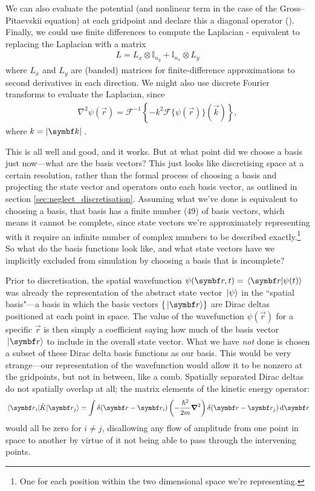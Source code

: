 We can also evaluate the potential (and nonlinear term in the case of the Gross--Pitaevskii equation) at each gridpoint and declare this a diagonal operator (). Finally, we could use finite differences to compute the Laplacian - equivalent to replacing the Laplacian with a matrix
\begin{align}
L = L_x \otimes \mathbb{I}_{n_y} + \mathbb{I}_{n_x} \otimes L_y 
\end{align} 
where $L_x$ and $L_y$ are (banded) matrices for finite-difference approximations to second derivatives in each direction. We might also use discrete Fourier transforms to evaluate the Laplacian, since
\begin{align}
\nabla^2\psi(\vec r) = \mathcal{F}^{-1}\left\{-k^2\mathcal{F}\{\psi(\vec r)\}(\vec k)\right\},
\end{align}
where $ k = \abs{\vec k}$.

This is all well and good, and it works. But at what point did we choose a basis just now---what are the basis vectors? This just looks like discretising space at a certain resolution, rather than the formal process of choosing a basis and projecting the state vector and operators onto each basis vector, as outlined in section \ref{sec:neglect_discretisation}. Assuming what we've done is equivalent to choosing a basis, that basis has a finite number ($49$) of basis vectors, which means it cannot be complete, since state vectors we're approximately representing with it require an infinite number of complex numbers to be described exactly.\footnote{One for each position within the two dimensional space we're representing.} So what do the basis functions look like, and what state vectors have we implicitly excluded from simulation by choosing a basis that is incomplete?

Prior to discretisation, the spatial wavefunction $\psi(\vec r, t) = \braket{\vec r}{\psi(t)}$ was already the representation of the abstract state vector $\ket{\psi}$ in the ``spatial basis"---a basis in which the basis vectors $\{\ket{\vec r}\}$ are Dirac deltas positioned at each point in space. The value of the wavefunction $\psi(\vec r)$ for a specific $\vec r$ is then simply a coefficient saying how much of the basis vector $\ket{\vec r}$ to include in the overall state vector. What we have \emph{not} done is chosen a subset of these Dirac delta basis functions as our basis. This would be very strange---our representation of the wavefunction would allow it to be nonzero at the gridpoints, but not in between, like a comb. Spatially separated Dirac deltas do not spatially overlap at all; the matrix elements of the kinetic energy operator:
\begin{align}
\matrixel{\vec r_i}{\hat K}{\vec r_j} = \int \delta(\vec r - \vec r_i)\left(-\frac{\hbar^2}{2m}\grad^2\right)\delta(\vec r - \vec r_j)\,\dd \vec r
\end{align}
would all be zero for $i\neq j$, disallowing any flow of amplitude from one point in space to another by virtue of it not being able to pass through the intervening points.

